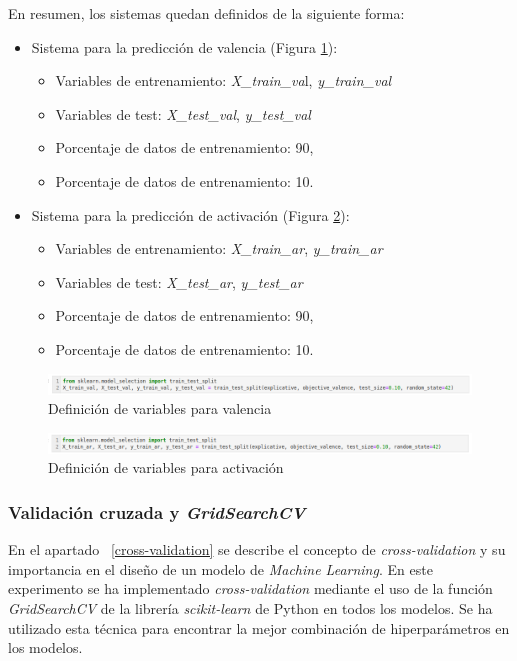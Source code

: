 \documentclass[12pt,a4paper]{article}
\begin{document}
En resumen, los sistemas quedan definidos de la siguiente forma:
\begin{itemize}
	\item Sistema para la predicción de valencia (Figura \ref{fig:splitvalence}):
	\begin{itemize}
		\item Variables de entrenamiento: \textit{X\_train\_va}l, \textit{y\_train\_val}
		\item Variables de test: \textit{X\_test\_val}, \textit{y\_test\_val}
		\item Porcentaje de datos de entrenamiento: 90,
		\item Porcentaje de datos de entrenamiento: 10.
	\end{itemize}
	\item Sistema para la predicción de activación (Figura \ref{fig:splitarousal}):
	\begin{itemize}
		\item Variables de entrenamiento: \textit{X\_train\_ar}, \textit{y\_train\_ar}
		\item Variables de test: \textit{X\_test\_ar}, \textit{y\_test\_ar}
		\item Porcentaje de datos de entrenamiento: 90,
		\item Porcentaje de datos de entrenamiento: 10.
	\end{itemize}

\end{itemize}

\begin{figure}[H]
	\centering
	\includegraphics[width=1\linewidth]{figs/split_valence}
	\caption{Definición de variables para valencia}
	\label{fig:splitvalence}
\end{figure}
\begin{figure}[H]
	\centering
	\includegraphics[width=1\linewidth]{figs/split_arousal}
	\caption{Definición de variables para activación}
	\label{fig:splitarousal}
\end{figure}




\subsubsection{Validación cruzada y \textit{GridSearchCV}}\label{gridsearchcv}
En el apartado ~\ref{cross-validation} se describe el concepto de \textit{cross-validation} y su importancia en el diseño de un modelo de \textit{Machine Learning}. En este experimento se ha implementado \textit{cross-validation} mediante el uso de la función \textit{GridSearchCV} de la librería \textit{scikit-learn} de Python \cite{scikit-learn} en todos los modelos. Se ha utilizado esta técnica para encontrar la mejor combinación de hiperparámetros en los modelos.
\end{document}

